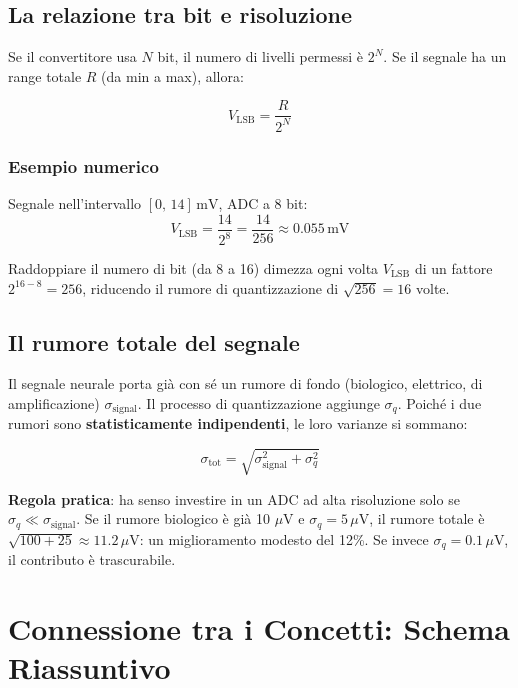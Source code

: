 \documentclass[12pt,a4paper]{article}
\begin{document}
\subsection{La relazione tra bit e risoluzione}

Se il convertitore usa $N$ bit, il numero di livelli permessi è $2^N$. Se il segnale ha un
range totale $R$ (da min a max), allora:

\begin{equation}
  V_{\text{LSB}} = \frac{R}{2^N}
\end{equation}

\subsubsection*{Esempio numerico}
Segnale nell'intervallo $[0,\, 14]\,\text{mV}$, ADC a 8 bit:
\[
  V_{\text{LSB}} = \frac{14}{2^8} = \frac{14}{256} \approx 0.055\,\text{mV}
\]

Raddoppiare il numero di bit (da 8 a 16) dimezza ogni volta $V_{\text{LSB}}$ di un fattore
$2^{16-8} = 256$, riducendo il rumore di quantizzazione di $\sqrt{256} = 16$ volte.

\subsection{Il rumore totale del segnale}

Il segnale neurale porta già con sé un rumore di fondo (biologico, elettrico, di amplificazione)
$\sigma_{\text{signal}}$. Il processo di quantizzazione aggiunge $\sigma_q$. Poiché i due rumori
sono \textbf{statisticamente indipendenti}, le loro varianze si sommano:

\begin{equation}
  \boxed{\sigma_{\text{tot}} = \sqrt{\sigma_{\text{signal}}^2 + \sigma_q^2}}
\end{equation}

\begin{keybox}
\textbf{Regola pratica}: ha senso investire in un ADC ad alta risoluzione solo se
$\sigma_q \ll \sigma_{\text{signal}}$. Se il rumore biologico è già 10 $\mu$V e
$\sigma_q = 5\,\mu$V, il rumore totale è $\sqrt{100+25} \approx 11.2\,\mu$V: un miglioramento
modesto del 12\%. Se invece $\sigma_q = 0.1\,\mu$V, il contributo è trascurabile.
\end{keybox}

\section{Connessione tra i Concetti: Schema Riassuntivo}
\end{document}
